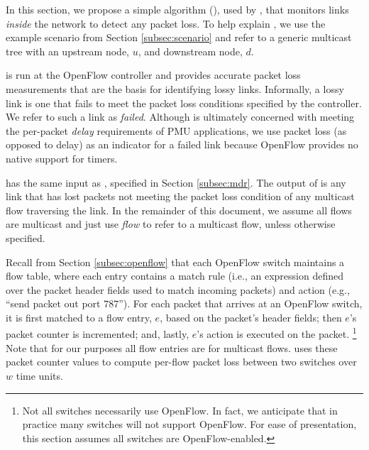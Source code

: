 
In this section, we propose a simple algorithm (\fls), used by \mdrs, that monitors links \emph{inside} the network to detect any packet loss.  To help explain \fls,
we use the example scenario from Section \ref{subsec:scenario} and refer to a generic multicast tree with an upstream node, $u$, and downstream node, $d$.

\fl is run at the OpenFlow controller and provides accurate packet loss measurements that are the basis for identifying lossy links.
Informally, a lossy link is one that fails to meet the packet loss conditions specified by the controller.  We refer to such a link as \emph{failed}.
Although \mdr is ultimately concerned with meeting the per-packet \emph{delay} requirements of PMU applications, 
we use  packet loss (as opposed to delay) as an indicator for a failed link because OpenFlow provides no native support for timers.

\fl has the same input as \mdrs, specified in Section \ref{subsec:mdr}.
The output of \fl is any link that has lost packets not meeting the packet loss condition of any multicast flow traversing the link. 
In the remainder of this document, we assume all flows are multicast and just use \emph{flow} to refer to a multicast flow, unless otherwise specified.

Recall from Section \ref{subsec:openflow} that each OpenFlow switch maintains a flow table, where each entry contains a match rule 
(i.e., an expression defined over the packet header fields used to match incoming packets) and action 
(e.g., ``send packet out port $787$''). For each packet that arrives at an OpenFlow switch, it is first matched to a flow entry, $e$, based on the packet's header fields; 
then $e$'s packet counter is incremented; and, lastly, $e$'s action is executed on the packet. 
\footnote{Not all switches necessarily use OpenFlow. In fact, we anticipate that in practice many switches will not support OpenFlow. For ease of presentation, this section assumes all switches are OpenFlow-enabled. }
Note that for our purposes all flow entries are for multicast flows. 
\fl uses these packet counter values to compute per-flow packet loss between two switches over $w$ time units. 

